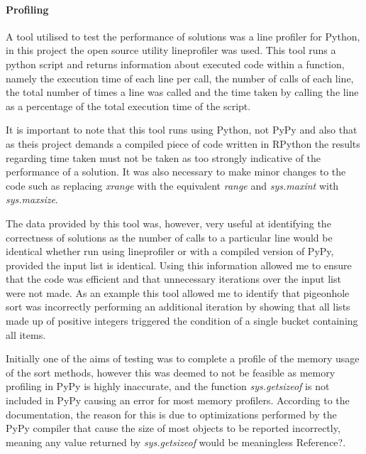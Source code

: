 \documentclass[12pt]{article}
\begin{document}
\paragraph{Profiling}
A tool utilised to test the performance of solutions was a line profiler for Python, in this project the open source utility line\textunderscore profiler \cite{lineprof} was used. This tool runs a python script and returns information about executed code within a function, namely the execution time of each line per call, the number of calls of each line, the total number of times a line was called and the time taken by calling the line as a percentage of the total execution time of the script.
\par 
It is important to note that this tool runs using Python, not PyPy and also that as theis project demands a compiled piece of code written in RPython the results regarding time taken must not be taken as too strongly indicative of the performance of a solution. It was also necessary to make minor changes to the code such as replacing \textit{xrange} with the equivalent \textit{range} and \textit{sys.maxint} with \textit{sys.maxsize}.
\par 
The data provided by this tool was, however, very useful at identifying the correctness of solutions as the number of calls to a particular line would be identical whether run using line\textunderscore profiler or with a compiled version of PyPy, provided the input list is identical. Using this information allowed me to ensure that the code was efficient and that unnecessary iterations over the input list were not made. As an example this tool allowed me to identify that pigeonhole sort was incorrectly performing an additional iteration by showing that all lists made up of positive integers triggered the condition of a single bucket containing all items.
\par
Initially one of the aims of testing was to complete a profile of the memory usage of the sort methods, however this was deemed to not be feasible as memory profiling in PyPy is highly inaccurate, and the function \textit{sys.getsizeof} is not included in PyPy causing an error for most memory profilers. According to the documentation, the reason for this is due to optimizations performed by the PyPy compiler that cause the size of most objects to be reported incorrectly, meaning any value returned by \textit{sys.getsizeof} would be meaningless {\color{red} Reference?}.
\end{document}
